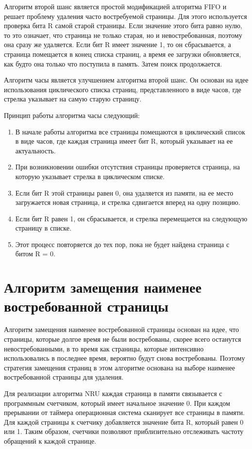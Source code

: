 Алгоритм второй шанс является простой модификацией алгоритма FIFO
и решает проблему удаления часто востребуемой страницы. Для этого используется проверка бита R самой старой страницы. Если значение этого бита
равно нулю, то это означает, что страница не только старая, но и невостребованная, поэтому она сразу же удаляется. Если бит R имеет значение 1, то
он сбрасывается, а страница помещается в конец списка страниц, а время ее
загрузки обновляется, как будто она только что поступила в память. Затем поиск продолжается.

Алгоритм часы является улучшением алгоритма второй шанс. Он основан на идее использования циклического списка страниц, представленного в
виде часов, где стрелка указывает на самую старую страницу.

Принцип работы алгоритма часы следующий:
\begin{enumerate}
	\item В начале работы алгоритма все страницы помещаются в циклический
	список в виде часов, где каждая страница имеет бит R, который указывает на ее актуальность.
	\item При возникновении ошибки отсутствия страницы проверяется страница,
	на которую указывает стрелка в циклическом списке.
	\item Если бит R этой страницы равен 0, она удаляется из памяти, на ее
	место загружается новая страница, и стрелка сдвигается вперед на одну
	позицию.
	\item Если бит R равен 1, он сбрасывается, и стрелка перемещается на следующую страницу в списке.
	\item Этот процесс повторяется до тех пор, пока не будет найдена страница с
	битом R = 0.
\end{enumerate}

\section{Алгоритм замещения наименее востребованной страницы}

Алгоритм замещения наименее востребованной страницы основан на идее, что страницы, которые долгое время не были востребованы, скорее всего
останутся невостребованными, в то время как страницы, которые интенсивно
использовались в последнее время, вероятно будут снова востребованы. Поэтому стратегия замещения страниц в этом алгоритме основана на выборе
наименее востребованной страницы для удаления.

Для реализации алгоритма NRU каждая страница в памяти связывается
с программным счетчиком, который имеет начальное значение 0. При каждом
прерывании от таймера операционная система сканирует все страницы в
памяти. Для каждой страницы к счетчику добавляется значение бита R,
который равен 0 или 1. Таким образом, счетчики позволяют приблизительно
отслеживать частоту обращений к каждой странице.

